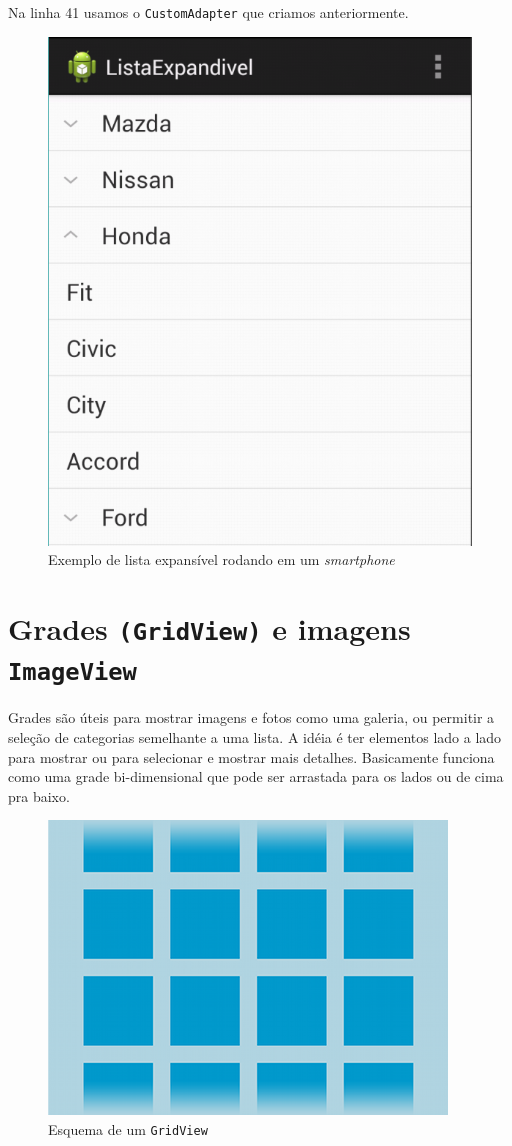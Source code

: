 \documentclass[a4paper,12pt,brazil]{book}
\begin{document}
\begin{singlespace}
 Na linha 41 usamos o \texttt{CustomAdapter} que criamos anteriormente.

\begin{figure}[H]
  \centering
  \includegraphics[width=.475\textwidth]{figuras/design/listaexpandivel.png}
  \caption{Exemplo de lista expansível rodando em um \emph{smartphone}}
  \label{fig:e}
\end{figure}

\newpage
\section{Grades \texttt{(GridView)} e imagens \texttt{ImageView}}

Grades são úteis para mostrar imagens e fotos como uma galeria, ou permitir a seleção de categorias semelhante a uma lista. A idéia é ter elementos lado a lado para mostrar ou para selecionar e mostrar mais detalhes. Basicamente funciona como uma grade bi-dimensional que pode ser arrastada para os lados ou de cima pra baixo. 

\begin{figure}[H]
  \centering
  \includegraphics[width=.475\textwidth]{figuras/design/gridview.png}
  \caption{Esquema de um \texttt{GridView}}
  \label{fig:e}
\end{figure}


\end{singlespace}
\end{document}

